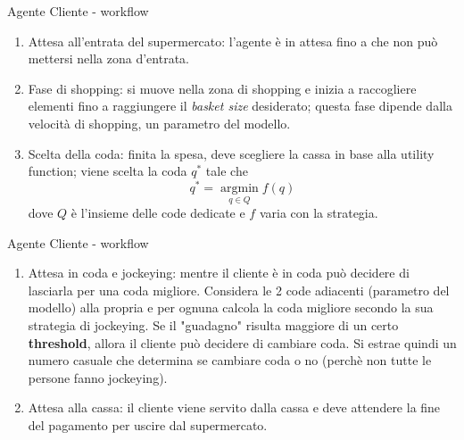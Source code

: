 \begin{frame}{Agente Cliente - workflow}
	\begin{enumerate}
		\item Attesa all'entrata del supermercato: l'agente è in attesa fino a che non può mettersi nella zona d'entrata.
		\item Fase di shopping: si muove nella zona di shopping e inizia a raccogliere elementi fino a raggiungere il \textit{basket size} desiderato; questa fase dipende dalla velocità di shopping, un parametro del modello.
		\item Scelta della coda: finita la spesa, deve scegliere la cassa in base alla utility function; viene scelta la coda $q^*$ tale che
		\[q^* = \operatorname*{argmin}_{q \in Q} f(q)\]
		dove $Q$ è l'insieme delle code dedicate e $f$ varia con la strategia.
	\end{enumerate}
\end{frame}
\begin{frame}{Agente Cliente - workflow}
	\begin{enumerate}
		\item Attesa in coda e jockeying: mentre il cliente è in coda può decidere di lasciarla per una coda migliore. Considera le 2 code adiacenti (parametro del modello) alla propria e per ognuna calcola la coda migliore secondo la sua strategia di jockeying. Se il "guadagno" risulta maggiore di un certo \textbf{threshold}, allora il cliente può decidere di cambiare coda. Si estrae quindi un numero casuale che determina se cambiare coda o no (perchè non tutte le persone fanno jockeying).
		\item Attesa alla cassa: il cliente viene servito dalla cassa e deve attendere la fine del pagamento per uscire dal supermercato.
	\end{enumerate}
\end{frame}




